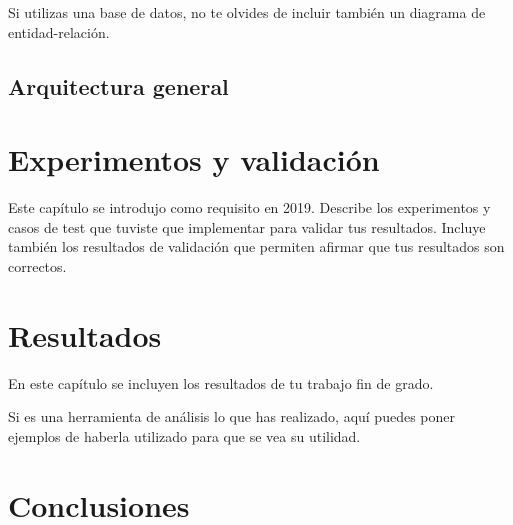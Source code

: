 \documentclass[a4paper, 12pt]{book}
\begin{document}
Si utilizas una base de datos, no te olvides de incluir también un diagrama de entidad-relación.

\section{Arquitectura general} 
\label{sec:arquitectura}


\cleardoublepage
\chapter{Experimentos y validación}
\label{chap:experimentos}

Este capítulo se introdujo como requisito en 2019. 
Describe los experimentos y casos de test que tuviste que implementar para validar tus resultados. 
Incluye también los resultados de validación que permiten afirmar que tus resultados son correctos. 



\cleardoublepage
\chapter{Resultados}
\label{chap:resultados}

En este capítulo se incluyen los resultados de tu trabajo fin de grado.

Si es una herramienta de análisis lo que has realizado, aquí puedes poner ejemplos de haberla utilizado para que se vea su utilidad.



\cleardoublepage
\chapter{Conclusiones}
\label{chap:conclusiones}
\end{document}
